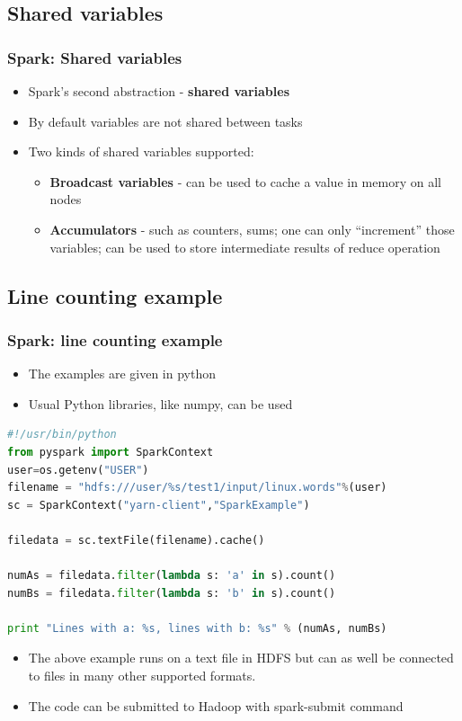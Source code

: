 \documentclass{beamer}
\begin{document}
\subsection{Shared variables}
\begin{frame}
  \frametitle{Spark: Shared variables}
  \begin{itemize}
   \item Spark's second abstraction - {\color{mycolordef}\textbf{shared variables}}
   \item By default variables are not shared between tasks
   \item Two kinds of shared variables supported:
    \begin{itemize}
      \item {\color{mycolordef}\textbf{Broadcast variables}} - can be used to cache a value in memory on all nodes
      \item {\color{mycolordef}\textbf{Accumulators}} - such as counters, sums; one can only ``increment'' those variables; can be used to store intermediate results of reduce operation
    \end{itemize}	
  \end{itemize} 
\end{frame}

\subsection{Line counting example}
\begin{frame}[fragile]
  \frametitle{Spark: line counting example}
  \begin{itemize}
    \item The examples are given in python
    \item Usual Python libraries, like numpy, can be used
  \end{itemize}
{\color{mycolorcode}
  \begin{lstlisting}[frame=single, basicstyle=\tiny,language=python]
#!/usr/bin/python
from pyspark import SparkContext
user=os.getenv("USER")
filename = "hdfs:///user/%s/test1/input/linux.words"%(user)
sc = SparkContext("yarn-client","SparkExample")

filedata = sc.textFile(filename).cache()

numAs = filedata.filter(lambda s: 'a' in s).count()
numBs = filedata.filter(lambda s: 'b' in s).count()

print "Lines with a: %s, lines with b: %s" % (numAs, numBs)
  \end{lstlisting}
}
  \begin{itemize}
  \item The above example runs on a text file in HDFS but can as well be connected to files in many other supported formats.
  \item The code can be submitted to Hadoop with {\color{mycolorcli}spark-submit} command
  \end{itemize}

\end{frame}
\end{document}
